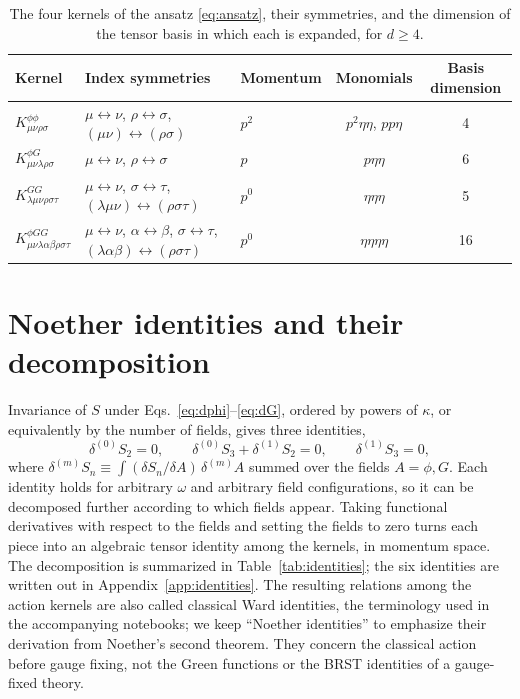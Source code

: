 \documentclass[prd,aps,preprint,nofootinbib,amsmath,amssymb,eqsecnum]{revtex4-2}
\begin{document}
\begin{table}[htb]
\centering
\setlength{\tabcolsep}{10pt}
\begin{tabular}{@{}lp{4.6cm}lcc@{}}
\toprule
Kernel & \raggedright Index symmetries & Momentum & Monomials & Basis dimension \\
\midrule
$K^{\phi\phi}_{\mu\nu\rho\sigma}$ & \raggedright $\mu\leftrightarrow\nu$, $\rho\leftrightarrow\sigma$, $(\mu\nu)\leftrightarrow(\rho\sigma)$ & $p^2$ & $p^2\eta\eta$, $pp\eta$ & 4 \\
$K^{\phi G}_{\mu\nu\lambda\rho\sigma}$ & \raggedright $\mu\leftrightarrow\nu$, $\rho\leftrightarrow\sigma$ & $p$ & $p\eta\eta$ & 6 \\
$K^{GG}_{\lambda\mu\nu\rho\sigma\tau}$ & \raggedright $\mu\leftrightarrow\nu$, $\sigma\leftrightarrow\tau$, $(\lambda\mu\nu)\leftrightarrow(\rho\sigma\tau)$ & $p^0$ & $\eta\eta\eta$ & 5 \\
$K^{\phi GG}_{\mu\nu\lambda\alpha\beta\rho\sigma\tau}$ & \raggedright $\mu\leftrightarrow\nu$, $\alpha\leftrightarrow\beta$, $\sigma\leftrightarrow\tau$, $(\lambda\alpha\beta)\leftrightarrow(\rho\sigma\tau)$ & $p^0$ & $\eta\eta\eta\eta$ & 16 \\
\bottomrule
\end{tabular}
\caption{The four kernels of the ansatz \eqref{eq:ansatz}, their symmetries, and the
dimension of the tensor basis in which each is expanded, for $d\geq4$.}
\label{tab:kernels}
\end{table}

\section{Noether identities and their decomposition}
\label{sec:identities}

Invariance of $S$ under Eqs.~\eqref{eq:dphi}--\eqref{eq:dG}, ordered by powers of
$\kappa$, or equivalently by the number of fields, gives three identities,
\begin{equation}
\delta^{(0)}S_2=0,\qquad
\delta^{(0)}S_3+\delta^{(1)}S_2=0,\qquad
\delta^{(1)}S_3=0,
\label{eq:noether}
\end{equation}
where $\delta^{(m)}S_n\equiv\int(\delta S_n/\delta A)\,\delta^{(m)}A$ summed over the
fields $A=\phi,G$. Each identity holds for arbitrary $\omega$ and arbitrary field
configurations, so it can be decomposed further according to which fields appear. Taking
functional derivatives with respect to the fields and setting the fields to zero turns each
piece into an algebraic tensor identity among the kernels, in momentum space. The
decomposition is summarized in Table~\ref{tab:identities}; the six identities are written out
in Appendix~\ref{app:identities}. The resulting relations among the action kernels are also
called classical Ward identities, the terminology used in the accompanying notebooks; we
keep ``Noether identities'' to emphasize their derivation from Noether's second theorem.
They concern the classical action before gauge fixing, not the Green functions or the BRST
identities of a gauge-fixed theory.
\end{document}
